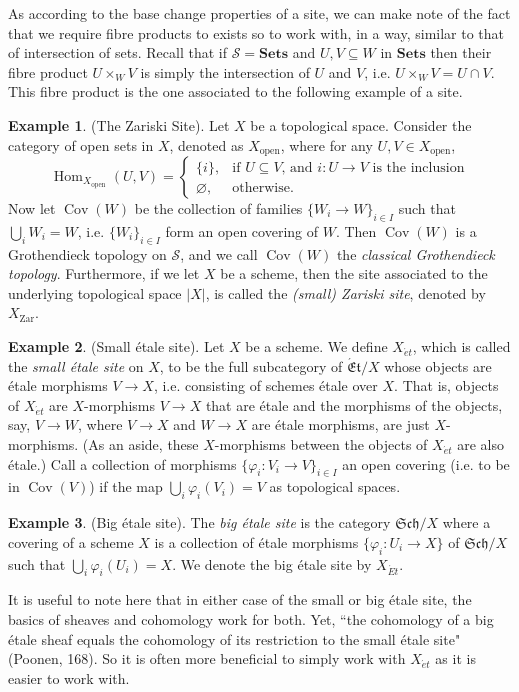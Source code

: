 \documentclass[oneside]{amsart}
\theoremstyle{definition}
\DeclareMathOperator{\cov}{Cov}
\newtheorem{ex}{Example}[section]
\DeclareMathOperator{\Hom}{Hom}
\begin{document}
As according to the base change properties of a site, we can make note of the fact that we require fibre products to exists so to work with, in a way, similar to that of intersection of sets. Recall that if $\mathcal S = \mathbf{Sets}$ and $U, V \subseteq W$ in $\mathbf{Sets}$ then their fibre product $U \times_W V$ is simply the intersection of $U$ and $V$, i.e. $U \times_W V = U \cap V$. This fibre product is the one associated to the following example of a site. 
\begin{ex} (The Zariski Site). Let $X$ be a topological space. Consider the category of open sets in $X$, denoted as $X_{\text{open}}$, where for any $U,V \in X_{\text{open}}$, 
\[
\Hom_{X_{\text{open}}}(U,V) = \begin{cases}
 \{i \}, 	& \text{if $U \subseteq V$, and $i \colon U \to V$ is the inclusion} \\
 \varnothing, & \text{otherwise.} 
 \end{cases}
\] Now let $\cov (W)$ be the collection of families $\{W_i \to W \}_{i \in I}$ such that $\bigcup _i W_i = W$, i.e. $ \{W_i \}_{i \in I}$ form an open covering of $W$. Then $\cov(W)$ is a Grothendieck topology on $\mathcal S$, and we call $\cov (W)$ the \textit{classical Grothendieck topology}. Furthermore, if we let $X$ be a scheme, then the site associated to the underlying topological space $|X|$, is called the \textit{(small) Zariski site}, denoted by $X_{\text{Zar}}$.
\end{ex}
\begin{ex}(Small \'etale site). Let $X$ be a scheme. We define $X _{\acute{e} t}$, which is called the \textit{small \'etale site} on $X$, to be the full subcategory of $\mathfrak { \acute{E} t} /X$ whose objects are \'etale morphisms $V \to X$, i.e. consisting of schemes \'etale over $X$. That is, objects of $X _{\acute{e} t}$ are $X$-morphisms $ V \to X $ that are \'etale and the morphisms of the objects, say, $V \to W$, where $V \to X$ and $W \to X$ are \'etale morphisms, are just $X$-morphisms. (As an aside, these $X$-morphisms between the objects of $X_{\acute{e}t}$ are also \'etale.) Call a collection of morphisms $\{ \varphi_i \colon V_i \to V \} _{i \in I}$ an open covering (i.e. to be in $\cov(V)$) if the map $\bigcup_i \varphi_i (V_i) = V$ as topological spaces. 	
\end{ex}
\begin{ex}(Big \'etale site). The \textit{big \'etale site} is the category $\mathfrak {Sch}/X$ where a covering of a scheme $X$ is a collection of \'etale morphisms $\{ \varphi_i \colon U_i \to X \}$ of $\mathfrak {Sch}/X$ such that $\bigcup _i \varphi_i(U_i) = X$. We denote the big \'etale site by $X _{\acute{E}t}$.	

It is useful to note here that in either case of the small or big \'etale site, the basics of sheaves and cohomology work for both. Yet,  ``the cohomology of a big \'etale sheaf equals the cohomology of its restriction to the small \'etale site" (Poonen, 168). So it is often more beneficial to simply work with $X_{\acute{e} t}$ as it is easier to work with.
\end{ex}
\end{document}

